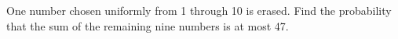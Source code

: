 One number chosen uniformly from 1 through 10 is erased. Find the probability that the sum of the remaining nine numbers is at most 47.
